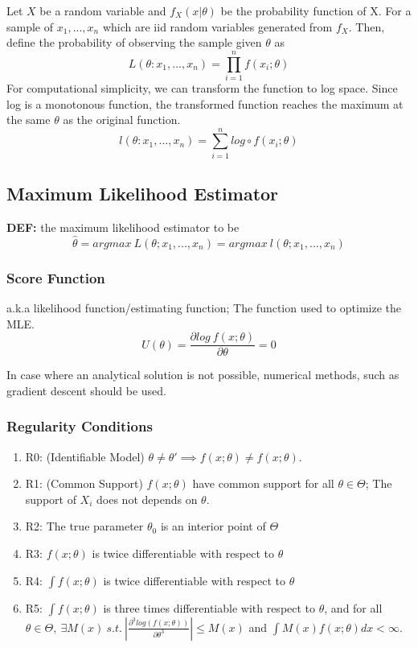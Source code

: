 \documentclass[9pt]{article}
\newcommand{\de}{\textbf{DEF: }}
\begin{document}
Let $X$ be a random variable and $f_X(x|\theta)$ be the probability function of X. For a sample of $x_1, ..., x_n$ which are iid random variables generated from $f_X$. Then, define the probability of observing the sample given $\theta$ as 
$$
L(\theta:x_1, ..., x_n) = \prod_{i=1}^{n}f(x_i;\theta)
$$
For computational simplicity, we can transform the function to log space. Since log is a monotonous function, the transformed function reaches the maximum at the same $\theta$ as the original function.
$$
l(\theta:x_1, ..., x_n) = \sum_{i=1}^{n}log\circ f(x_i;\theta)
$$
\subsection{Maximum Likelihood Estimator}

\de the maximum likelihood estimator to be
$$
\hat \theta = argmax\ L(\theta; x_1,...,x_n) = argmax\ l(\theta;x_1, ..., x_n)
$$
\subsubsection{Score Function}

a.k.a likelihood function/estimating function; The function used to optimize the MLE.
$$
U(\theta) =\frac{\partial log\ f(x;\theta)}{\partial \theta} = 0
$$

In case where an analytical solution is not possible, numerical methods, such as gradient descent should be used. \newline

\subsubsection{Regularity Conditions}
\begin{enumerate}
    \item R0: (Identifiable Model) $\theta \not = \theta' \implies f(x;\theta) \not = f(x;\theta)$.
    \item R1: (Common Support) $f(x;\theta)$ have common support for all $\theta \in \Theta$; The support of $X_i$ does not depends on $\theta$.
    \item R2: The true parameter $\theta_0$ is an interior point of $\Theta$
    \item R3: $f(x;\theta)$ is twice differentiable with respect to $\theta$
    \item R4: $\int f(x;\theta)$ is twice differentiable with respect to $\theta$
    \item R5: $\int f(x;\theta)$ is three times differentiable with respect to $\theta$, and for all $\theta \in \Theta,\ \exists M(x)\ s.t.\ |\frac{\partial^3log(f(x;\theta))}{\partial \theta^3}| \le M(x)$ and $\int M(x)f(x;\theta)dx < \infty$.
\end{enumerate}
\end{document}
